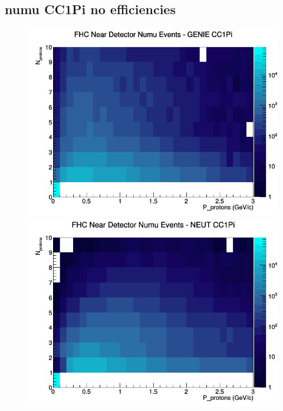\documentclass[12pt]{article}
\begin{document}
\subsection{numu CC1Pi no efficiencies}
\begin{figure}[h]
\includegraphics[width=\linewidth]{N_P/nominal/protons/CC1Pi_FHC_ND_numu_N_P_GENIE.png}
\endminipage
{}
\includegraphics[width=\linewidth]{N_P/nominal/protons/CC1Pi_FHC_ND_numu_N_P_NEUT.png}
\endminipage
{}

\end{figure}
\end{document}
